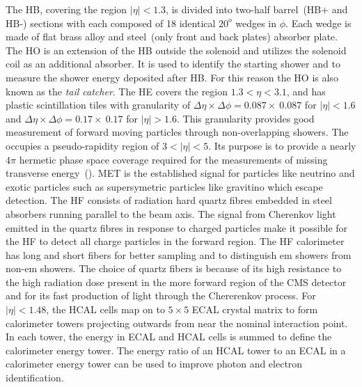 \newline 
The HB, covering the region $|\eta| < 1.3$, is divided into two-half barrel~(HB+ and HB-) sections with each composed of 18 identical $20^{o}$ wedges in $\phi$. Each wedge is made of flat brass alloy and steel~(only front and back plates) absorber plate. The HO is an extension of the HB outside the solenoid and utilizes the solenoid coil as an additional absorber. It is used to identify the starting shower and to measure the shower energy deposited after HB. For this reason the HO is also known as the \textit{tail catcher}.
The HE covers the region $1.3 < \eta < 3.1$, and has plastic scintillation tiles with granularity of  $\Delta\eta\times\Delta\phi=0.087 \times\ 0.087$ for $|\eta| < 1.6$ and  $\Delta\eta\times\Delta\phi=0.17 \times\ 0.17$ for $|\eta| > 1.6$. This granularity provides good measurement of forward moving particles through non-overlapping showers. 
\newline
The  occupies a pseudo-rapidity region of $3 < \vert \eta \vert < 5$.
Its purpose is to provide a nearly $4\pi$ hermetic phase space coverage required for the  measurements of missing transverse energy~(). MET is the established signal for particles like neutrino and exotic particles such as supersymetric particles like gravitino which escape detection. The HF consists of radiation hard quartz fibres embedded in steel absorbers running parallel to the beam axis. The signal from Cherenkov light emitted in the quartz fibres in response to charged particles make it possible for the HF to detect all charge particles in the forward region. The HF calorimeter has long and short fibers for better sampling and to distinguish em showers from non-em showers. The choice of quartz fibers is because of its high resistance to the high radiation dose present in the more forward region of the CMS detector and for its fast production of light through the Chererenkov process. 
\newline
For $\vert \eta \vert < 1.48$, the HCAL cells map on to $5\times5$ ECAL crystal matrix to form calorimeter towers projecting  outwards from near the nominal interaction point. In each tower, the energy in ECAL and HCAL cells is summed to define the calorimeter energy tower. The energy ratio of an HCAL tower to an ECAL in a calorimeter energy tower can be used to improve photon and electron identification. 
